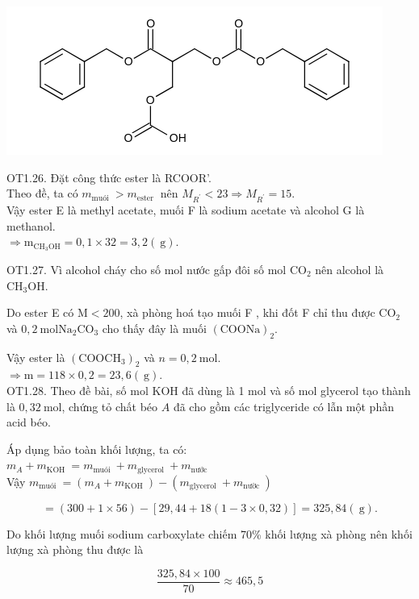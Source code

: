 \documentclass[10pt]{article}
\begin{document}
\includegraphics{smile-7ab118c0c8ea1ccb76756d5566478d28ef553197}

OT1.26. Đặt công thức ester là RCOOR'.\\
Theo đề, ta có $m_{\text {muói }}>m_{\text {ester }}$ nên $M_{R^{\prime}}<23 \Rightarrow M_{R^{\prime}}=15$.\\
Vậy ester E là methyl acetate, muối F là sodium acetate và alcohol G là methanol.\\
$\Rightarrow \mathrm{m}_{\mathrm{CH}_{3} \mathrm{OH}}=0,1 \times 32=3,2(\mathrm{~g})$.

OT1.27. Vì alcohol cháy cho số mol nước gấp đôi số mol $\mathrm{CO}_{2}$ nên alcohol là $\mathrm{CH}_{3} \mathrm{OH}$.

Do ester E có $\mathrm{M}<200$, xà phòng hoá tạo muối F , khi đốt F chỉ thu được $\mathrm{CO}_{2}$ và $0,2 \mathrm{~mol} \mathrm{Na}_{2} \mathrm{CO}_{3}$ cho thấy đây là muối $(\mathrm{COONa})_{2}$.

Vậy ester là $\left(\mathrm{COOCH}_{3}\right)_{2}$ và $n=0,2 \mathrm{~mol}$.\\
$\Rightarrow \mathrm{m}=118 \times 0,2=23,6(\mathrm{~g})$.\\
OT1.28. Theo đề bài, số mol KOH đã dùng là 1 mol và số mol glycerol tạo thành là $0,32 \mathrm{~mol}$, chứng tỏ chất béo $A$ đã cho gồm các triglyceride có lẫn một phần acid béo.

Áp dụng bảo toàn khối lượng, ta có:\\
$m_{A}+m_{\text {KOH }}=m_{\text {muói }}+m_{\text {glycerol }}+m_{\text {nước }}$\\
Vậy $m_{\text {muói }}=\left(m_{A}+m_{\text {KOH }}\right)-\left(m_{\text {glycerol }}+m_{\text {nườc }}\right)$

$$
=(300+1 \times 56)-[29,44+18(1-3 \times 0,32)]=325,84(\mathrm{~g}) .
$$

Do khối lượng muối sodium carboxylate chiếm 70\% khối lượng xà phòng nên khối lượng xà phòng thu được là


\begin{equation*}
\frac{325,84 \times 100}{70} \approx 465,5 \tag{g}
\end{equation*}
\end{document}
